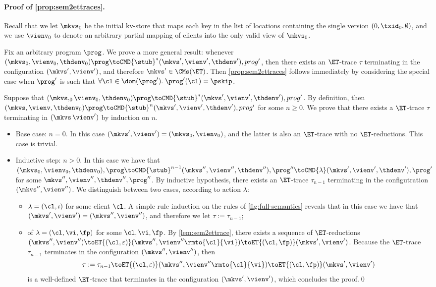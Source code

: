 \paragraph{Proof of \cref{prop:sem2ettraces}.} 
Recall that we let $\mkvs_{0}$ be the initial kv-store that maps 
each key in the list of locations containing the single version $(0, \txid_{0}, \emptyset)$, 
and we use $\vienv_{0}$ to denote an arbitrary partial mapping of clients into the only valid view 
of $\mkvs_{0}$.

Fix an arbitrary program $\prog$. We prove a more general result: 
whenever $(\mkvs_{0}, \vienv_{0}, \thdenv_{0}) \prog \toCMD{\stub}^{\ast} (\mkvs', \vienv', \thdenv'), prog'$, 
then there exists an $\ET$-trace $\tau$ terminating in the configuration $(\mkvs', \vienv')$, 
and therefore $\mkvs' \in \CMs(\ET)$.
Then \cref{prop:sem2ettraces} follows immediately by considering the 
special case when $\prog'$ is such that $\forall \cl \in \dom(\prog').\; \prog'(\cl) = \pskip$.

Suppose that $(\mkvs,_{0} \vienv_{0}, \thdenv_{0}) \prog \toCMD{\stub}^{\ast} (\mkvs', \vienv', \thdenv'), prog'$. 
By definition, then $(\mkvs, \vienv, \thdenv_{0}) \prog \toCMD{\stub}^{n} (\mkvs', \vienv', \thdenv'), prog'$ 
for some $n \geq 0$. We prove that there exists a $\ET$-trace $\tau$ terminating in $(\mkvs\, \vienv')$ 
by induction on $n$. 
\begin{itemize}
\item Base case: $n = 0$. In this case $(\mkvs', \vienv') = (\mkvs_{0}, \vienv_{0})$, and the latter 
is also an $\ET$-trace with no $\ET$-reductions. This case is trivial. 
\item Inductive step: $n > 0$. In this case we have that $(\mkvs_{0}, \vienv_{0}, \thdenv_{0}), \prog \toCMD{\stub}^{n-1} (\mkvs'', \vienv'', \thdenv''), \prog''
\toCMD{\lambda} (\mkvs', \vienv', \thdenv'), \prog'$ for some $\mkvs'', \vienv'', \thdenv'',\prog''$. By inductive hypothesis, 
there exists an $\ET$-trace $\tau_{n-1}$ terminating in the configutration $(\mkvs'', \vienv'')$. 
We distinguish between two cases, according to action $\lambda$: 
\begin{itemize}
\item $\lambda = (\cl, \iota)$ for some client $\cl$. A simple rule induction on the rules of \cref{fig:full-semantics} 
reveals that in this case we have that $(\mkvs', \vienv') = (\mkvs'', \vienv'')$, and therefore we let $\tau := \tau_{n-1}$; 
\item of $\lambda = (\cl, \vi, \fp)$ for some $\cl, \vi, \fp$. By \cref{lem:sem2ettrace}, there exists a sequence 
of $\ET$-reductions $(\mkvs'', \vienv'') \toET{(\cl, \varepsilon)} (\mkvs'', \vienv''\rmto{\cl}{\vi}) \toET{(\cl, \fp)} (\mkvs', \vienv')$. 
Because the $\ET$-trace $\tau_{n-1}$ terminates in the configuration $(\mkvs'', \vienv'')$, then
\[
\tau := \tau_{n-1} \toET{(\cl, \varepsilon)} (\mkvs'', \vienv''\rmto{\cl}{\vi}) \toET{(\cl, \fp)} (\mkvs', \vienv')
\]
is a well-defined $\ET$-trace that terminates in the configuration $(\mkvs', \vienv')$, which concludes the proof.\hfil\qed
\end{itemize}
\end{itemize}

